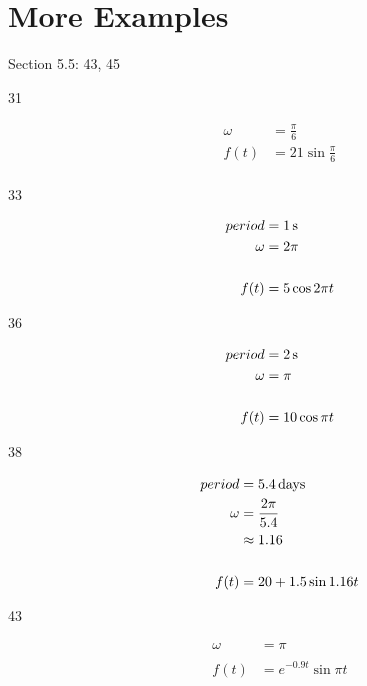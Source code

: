 \documentclass{exam}
\begin{document}
  \section{More Examples}
  Section 5.5: 43, 45

  \begin{description}
    \item[31]
      \begin{align*}
        \omega & = \frac{\pi}{6} \\
        f(t)   & = 21 \sin \frac{\pi}{6} \\
      \end{align*}

    \item[33]
      \begin{align*}
        period & = \unit[1]{s} \\
        \omega & = 2 \pi \\
        \\
        f(t)   & = 5 \cos 2 \pi t \\
      \end{align*}

    \item[36]
      \begin{align*}
        period & = \unit[2]{s} \\
        \omega & = \pi \\
        \\
        f(t)   & = 10 \cos \pi t \\
      \end{align*}

    \item[38]
      \begin{align*}
        period & = \unit[5.4]{days} \\
        \omega & = \frac{2 \pi}{5.4} \\
               & \approx 1.16 \\
        \\
        f(t)   & = 20 + 1.5 \sin 1.16 t \\
      \end{align*}

    \item[43]
      \begin{align*}
        \omega & = \pi \\
        \\
        f(t)   & = e^{-0.9 t} \sin \pi t \\
      \end{align*}

  \end{description}
\end{document}

